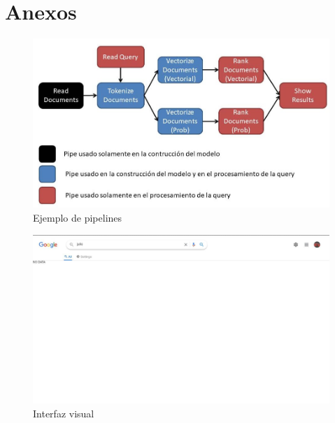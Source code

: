 \documentclass[runningheads]{llncs}
\begin{document}
\section{Anexos}

\begin{figure}
\includegraphics[width=\textwidth]{pipeline.jpg}
\caption{Ejemplo de pipelines} \label{pipeline_fig}
\end{figure}

\begin{figure}
\includegraphics[width=\textwidth]{ui.jpg}
\caption{Interfaz visual} \label{ui_fig}
\end{figure}
    
\end{document}
